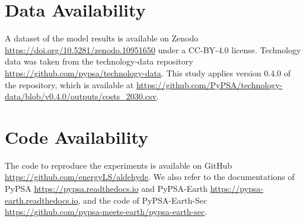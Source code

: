 \documentclass[5p,numafflabel]{elsarticle}
\begin{document}
\section*{Data Availability}
A dataset of the model results is available on Zenodo \href{https://doi.org/10.5281/zenodo.10951650}{https://doi.org/10.5281/zenodo.10951650} under a CC-BY-4.0 license. 
Technology data was taken from the technology-data repository \href{https://github.com/pypsa/technology-data}{https://github.com/pypsa/technology-data}. 
This study applies version 0.4.0 of the repository, which is available at \href{https://github.com/PyPSA/technology-data/blob/v0.4.0/outputs/costs_2030.csv}{https://github.com/PyPSA/technology-data/blob/v0.4.0/outputs/costs\_2030.csv}.

\section*{Code Availability}
The code to reproduce the experiments is available on GitHub \href{https://github.com/energyLS/aldehyde}{https://github.com/energyLS/aldehyde}.
We also refer to the documentations of PyPSA \href{https://pypsa.readthedocs.io}{https://pypsa.readthedocs.io} and PyPSA-Earth \href{https://pypsa-earth.readthedocs.io}{https://pypsa-earth.readthedocs.io}, and the code of PyPSA-Earth-Sec
\href{https://github.com/pypsa-meets-earth/pypsa-earth-sec}{https://github.com/pypsa-meets-earth/pypsa-earth-sec}.
\end{document}
